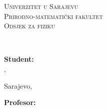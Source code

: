 \begin{titlepage}
	\begin{figure}[t]
		\centering
		\begin{minipage}{.6\textwidth}
			\centering
			\textsc{\large Univerzitet u Sarajevu}\\
			\textsc{\large Prirodno-matematički fakultet}\\
			\textsc{\large Odsjek za fiziku}
		\end{minipage}
	\end{figure}
	\vspace*{\fill}
	\begin{center}
		\textbf{\Large \MakeUppercase\@naslov}\\
		\vspace{2mm}
		\large \MakeUppercase\@podnaslov
	\end{center}
	\vspace*{\fill}
	\begin{figure}[b]
		\centering
		\begin{minipage}{.325\textwidth}
			\textbf{Student:}\\
			\@student, \@indeks \\
		\end{minipage}
		\begin{minipage}{.30\textwidth}
			\begin{center}
				\vspace{25mm}
				Sarajevo, \@datum
			\end{center}
		\end{minipage}
		\begin{minipage}{.325\textwidth}
			\textbf{Profesor: }\\
			\@profesor \\
		\end{minipage}
	\end{figure}
\end{titlepage}